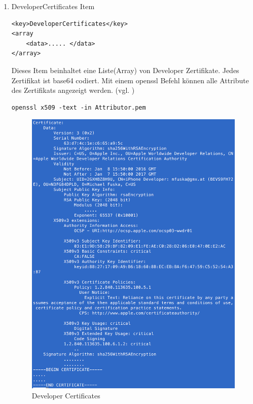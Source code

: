 \begin{enumerate}
    \item DeveloperCertificates Item
\begin{lstlisting}[captionpos=b, caption={DeveloperCertificates Item}]        
<key>DeveloperCertificates</key>
<array                
    <data>..... </data>
</array>
\end{lstlisting}

Dieses Item beinhaltet eine Liste(Array) von Developer Zertifikate. Jedes Zertifikat ist base64 codiert. Mit einem openssl Befehl können alle Attribute des Zertifikats angezeigt werden. (vgl. \cite{iOSSec[5], Hacking[1]})
\lstset{
    language=bash,
    }
\begin{lstlisting}[captionpos=b, caption={Befehl: openssl -- Output Figure: \ref{fig:DeveloperCertificates} }]
openssl x509 -text -in Attributor.pem 
\end{lstlisting}

\begin{figure}[!ht]
        \centering
                \includegraphics[scale=0.7]{Cert-output}
        \caption{Developer Certificates}
        \label{fig:DeveloperCertificates}
\end{figure}


\end{enumerate}
